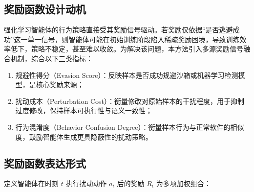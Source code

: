 \subsection{奖励函数设计动机}

强化学习智能体的行为策略直接受其奖励信号驱动。若奖励仅依据“是否逃避成功”这一单一信号，则智能体可能在初始训练阶段陷入稀疏奖励困境，导致训练效率低下，策略不稳定，甚至难以收敛。为解决该问题，本方法引入多源奖励信号融合机制，综合以下三类指标：

\begin{enumerate}
\item 规避性得分（Evasion Score）：反映样本是否成功规避沙箱或机器学习检测模型，是核心奖励来源；


\item 扰动成本（Perturbation Cost）：衡量修改对原始样本的干扰程度，用于抑制过度修改，保持样本可执行性与语义一致性；


\item 行为混淆度（Behavior Confusion Degree）：衡量样本行为与正常软件的相似度，鼓励智能体生成更具隐蔽性的扰动策略。

\end{enumerate}

\subsection{奖励函数表达形式}
 
定义智能体在时刻 $t$ 执行扰动动作 $a_t$ 后的奖励 $R_t$ 为多项加权组合：

